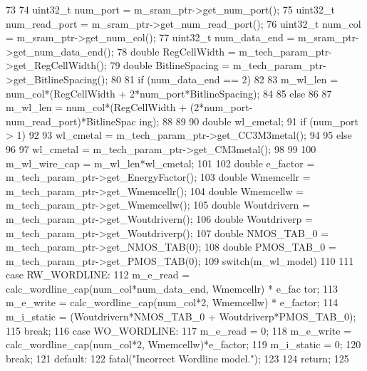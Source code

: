 \begin{DoxyCode}
73 {
74     uint32_t num_port = m_sram_ptr->get_num_port();
75     uint32_t num_read_port = m_sram_ptr->get_num_read_port();
76     uint32_t num_col = m_sram_ptr->get_num_col();
77     uint32_t num_data_end = m_sram_ptr->get_num_data_end();
78     double RegCellWidth = m_tech_param_ptr->get_RegCellWidth();
79     double BitlineSpacing = m_tech_param_ptr->get_BitlineSpacing();
80 
81     if (num_data_end == 2)
82     {
83         m_wl_len = num_col*(RegCellWidth + 2*num_port*BitlineSpacing);
84     }
85     else
86     {
87         m_wl_len = num_col*(RegCellWidth + (2*num_port-num_read_port)*BitlineSpac
      ing);
88     }
89 
90     double wl_cmetal;
91     if (num_port > 1)
92     {
93         wl_cmetal = m_tech_param_ptr->get_CC3M3metal();
94     }
95     else
96     {
97         wl_cmetal = m_tech_param_ptr->get_CM3metal();
98     }
99 
100     m_wl_wire_cap = m_wl_len*wl_cmetal;
101 
102     double e_factor = m_tech_param_ptr->get_EnergyFactor();
103     double Wmemcellr = m_tech_param_ptr->get_Wmemcellr();
104     double Wmemcellw = m_tech_param_ptr->get_Wmemcellw();
105     double Woutdrivern = m_tech_param_ptr->get_Woutdrivern();
106     double Woutdriverp = m_tech_param_ptr->get_Woutdriverp();
107     double NMOS_TAB_0 = m_tech_param_ptr->get_NMOS_TAB(0);
108     double PMOS_TAB_0 = m_tech_param_ptr->get_PMOS_TAB(0);
109     switch(m_wl_model)
110     {
111         case RW_WORDLINE:
112             m_e_read = calc_wordline_cap(num_col*num_data_end, Wmemcellr) * e_fac
      tor;
113             m_e_write = calc_wordline_cap(num_col*2, Wmemcellw) * e_factor;
114             m_i_static = (Woutdrivern*NMOS_TAB_0 + Woutdriverp*PMOS_TAB_0);
115             break;
116         case WO_WORDLINE:
117             m_e_read = 0;
118             m_e_write = calc_wordline_cap(num_col*2, Wmemcellw)*e_factor;
119             m_i_static = 0;
120             break;
121         default:
122             fatal("Incorrect Wordline model.\n");
123     }
124     return;
125 }
\end{DoxyCode}


